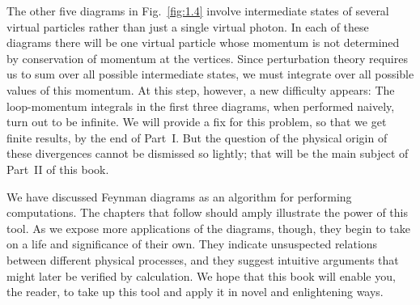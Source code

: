 The other five diagrams in Fig.~\ref{fig:1.4} involve intermediate states
of several virtual particles rather than just a single virtual photon.
In each of these diagrams there will be one virtual particle whose
momentum is not determined by conservation of momentum at the vertices.
Since perturbation theory requires us to sum over all possible
intermediate states, we must integrate over all possible values of this
momentum.  At this step, however, a new difficulty appears: The
loop-momentum integrals in the first three diagrams, when performed
naively, turn out to be infinite.  We will provide a fix for this problem,
so that we get finite results, by the end of Part~I.  But the question of
the physical origin of these divergences cannot be dismissed so lightly;
that will be the main subject of Part~II of this book.

We have discussed Feynman diagrams as an algorithm for performing
computations.  The chapters that follow should amply illustrate the power
of this tool.  As we expose more applications of the diagrams, though,
they begin to take on a life and significance of their own.  They indicate
unsuspected relations between different physical processes, and they
suggest intuitive arguments that might later be verified by calculation.
We hope that this book will enable you, the reader, to take up this tool
and apply it in novel and enlightening ways.
